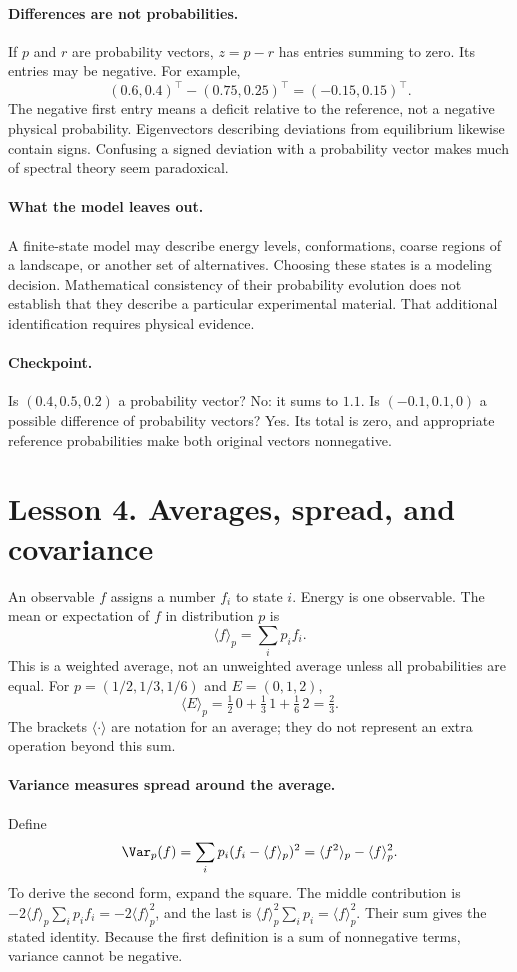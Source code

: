 \paragraph{Differences are not probabilities.}
If $p$ and $r$ are probability vectors, $z=p-r$ has entries summing to zero.
Its entries may be negative. For example,
\[
(0.6,0.4)^\top-(0.75,0.25)^\top=(-0.15,0.15)^\top.
\]
The negative first entry means a deficit relative to the reference, not a
negative physical probability. Eigenvectors describing deviations from
equilibrium likewise contain signs. Confusing a signed deviation with a
probability vector makes much of spectral theory seem paradoxical.

\paragraph{What the model leaves out.}
A finite-state model may describe energy levels, conformations, coarse regions
of a landscape, or another set of alternatives. Choosing these states is a
modeling decision. Mathematical consistency of their probability evolution
does not establish that they describe a particular experimental material.
That additional identification requires physical evidence.

\paragraph{Checkpoint.}
Is $(0.4,0.5,0.2)$ a probability vector? No: it sums to $1.1$. Is
$(-0.1,0.1,0)$ a possible difference of probability vectors? Yes. Its total is
zero, and appropriate reference probabilities make both original vectors
nonnegative.

\clearpage
\section*{Lesson 4. Averages, spread, and covariance}
An observable $f$ assigns a number $f_i$ to state $i$. Energy is one observable.
The mean or expectation of $f$ in distribution $p$ is
\[
\langle f\rangle_p=\sum_i p_i f_i.
\]
This is a weighted average, not an unweighted average unless all probabilities
are equal. For $p=(1/2,1/3,1/6)$ and $E=(0,1,2)$,
\[
\langle E\rangle_p=\tfrac12\,0+\tfrac13\,1+\tfrac16\,2=\tfrac23.
\]
The brackets $\langle\cdot\rangle$ are notation for an average; they do not
represent an extra operation beyond this sum.

\paragraph{Variance measures spread around the average.}
Define
\[
\Var_p(f)=\sum_i p_i(f_i-\langle f\rangle_p)^2
=\langle f^2\rangle_p-\langle f\rangle_p^2.
\]
To derive the second form, expand the square. The middle contribution is
$-2\langle f\rangle_p\sum_i p_i f_i=-2\langle f\rangle_p^2$, and the last
is $\langle f\rangle_p^2\sum_i p_i=\langle f\rangle_p^2$. Their sum gives
the stated identity. Because the first definition is a sum of nonnegative
terms, variance cannot be negative.

